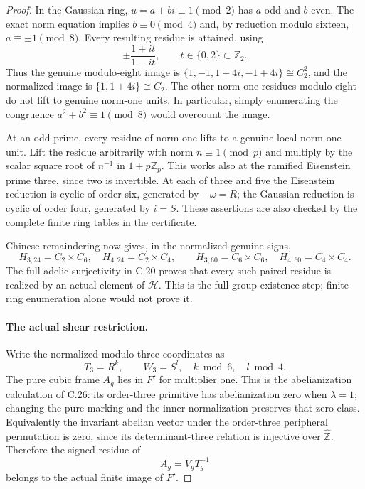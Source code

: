 \begin{proof}
In the Gaussian ring, $u=a+bi\equiv1\pmod2$ has $a$ odd and
$b$ even. The exact norm equation implies $b\equiv0\pmod4$ and,
by reduction modulo sixteen, $a\equiv\pm1\pmod8$.
Every resulting residue is attained, using
\[
 \pm\frac{1+it}{1-it},\qquad t\in\{0,2\}\subset\mathbb Z_2.
                                                               \tag{C.49.6}
\]
Thus the genuine modulo-eight image is
$\{1,-1,1+4i,-1+4i\}\cong C_2^2$, and the normalized image is
$\{1,1+4i\}\cong C_2$.
The other norm-one residues modulo eight do not lift to genuine
norm-one units. In particular, simply enumerating the congruence
$a^2+b^2\equiv1\pmod8$ would overcount the image.

At an odd prime, every residue of norm one lifts to a genuine local
norm-one unit. Lift the residue arbitrarily with norm $n\equiv1\pmod p$
and multiply by the scalar square root of $n^{-1}$ in $1+p\mathbb Z_p$.
This works also at the ramified Eisenstein prime three, since two
is invertible. At each of three and five the Eisenstein reduction
is cyclic of order six, generated by $-\omega=R$; the Gaussian
reduction is cyclic of order four, generated by $i=S$.
These assertions are also checked by the complete finite ring tables
in the certificate.

Chinese remaindering now gives, in the normalized genuine signs,
\[
 H_{3,24}=C_2\times C_6,\quad H_{4,24}=C_2\times C_4,
 \qquad H_{3,60}=C_6\times C_6,\quad H_{4,60}=C_4\times C_4.
                                                               \tag{C.49.7}
\]
The full adelic surjectivity in C.20 proves that every such paired
residue is realized by an actual element of $\mathcal H$.
This is the full-group existence step; finite ring enumeration
alone would not prove it.

\paragraph{The actual shear restriction.}
Write the normalized modulo-three coordinates as
\[
                       T_3=R^k,\qquad W_3=S^l,
                 \quad k\bmod6,\quad l\bmod4.          \tag{C.49.8}
\]
The pure cubic frame $A_g$ lies in $F'$ for multiplier one.
This is the abelianization calculation of C.26: its order-three
primitive has abelianization zero when $\lambda=1$; changing the
pure marking and the inner normalization preserves that zero class.
Equivalently the invariant abelian vector under the order-three
peripheral permutation is zero, since its determinant-three
relation is injective over $\widehat{\mathbb Z}$.
Therefore the signed residue of
\[
                              A_g=V_g T_g^{-1}          \tag{C.49.9}
\]
belongs to the actual finite image of $F'$.


\end{proof}
